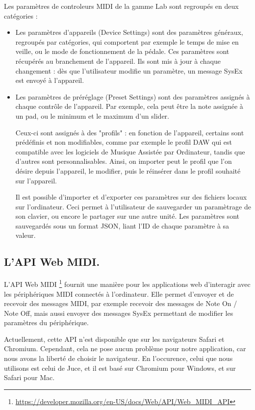 \documentclass[francais]{rapportPFE}  %
\begin{document}
Les paramètres de controleurs MIDI de la gamme Lab sont regroupés en deux catégories :
\begin{itemize}
    \item Les paramètres d'appareils (Device Settings) sont des paramètres généraux, regroupés par catégories, qui comportent par exemple le temps de mise en veille, ou le mode de fonctionnement de la pédale. Ces paramètres sont récupérés au branchement de l'appareil. Ils sont mis à jour à chaque changement : dès que l'utilisateur modifie un paramètre, un message SysEx est envoyé à l'appareil.
    \item Les paramètres de préréglage (Preset Settings) sont des paramètres assignés à chaque contrôle de l'appareil. Par exemple, cela peut être la note assignée à un pad, ou le minimum et le maximum d'un slider. 
    
    Ceux-ci sont assignés à des "profils" : en fonction de l'appareil, certains sont prédéfinis et non modifiables, comme par exemple le profil DAW qui est compatible avec les logiciels de Musique Assistée par Ordinateur, tandis que d'autres sont personnalisables. Ainsi, on importer peut le profil que l'on désire depuis l'appareil, le modifier, puis le réinsérer dans le profil souhaité sur l'appareil. 

    Il est possible d'importer et d'exporter ces paramètres sur des fichiers locaux sur l'ordinateur. Ceci permet à l'utilisateur de sauvegarder un paramètrage de son clavier, ou encore le partager sur une autre unité. Les paramètres sont sauvegardés sous un format JSON, liant l'ID de chaque paramètre à sa valeur.
\end{itemize}

\subsection{L'API Web MIDI.}

L'API Web MIDI
\footnote{\url{https://developer.mozilla.org/en-US/docs/Web/API/Web_MIDI_API}}
fournit une manière pour les applications web d'interagir avec les périphériques MIDI connectés à l'ordinateur. Elle permet d'envoyer et de recevoir des messages MIDI, par exemple recevoir des messages de Note On / Note Off, mais aussi envoyer des messages SysEx permettant de modifier les paramètres du périphérique.

Actuellement, cette API n'est disponible que sur les navigateurs Safari et Chromium. Cependant, cela ne pose aucun problème pour notre application, car nous avons la liberté de choisir le navigateur. En l'occurence, celui que nous utilisons est celui de Juce, et il est basé sur Chromium pour Windows, et sur Safari pour Mac.
\end{document}
